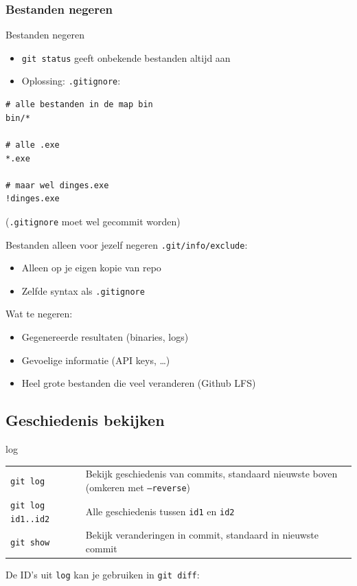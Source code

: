 \subsubsection{Bestanden negeren}
\begin{frame}[fragile]{Bestanden negeren}
	\begin{itemize}
		\item \texttt{git status} geeft onbekende bestanden altijd aan
		\item Oplossing: \texttt{.gitignore}:
	\end{itemize}
	\begin{verbatim}
# alle bestanden in de map bin
bin/*

# alle .exe
*.exe

# maar wel dinges.exe
!dinges.exe
	\end{verbatim}

	(\texttt{.gitignore} moet wel gecommit worden)
\end{frame}

\begin{frame}{Bestanden alleen voor jezelf negeren}
	\texttt{.git/info/exclude}:
	\begin{itemize}
		\item Alleen op je eigen kopie van repo
		\item Zelfde syntax als \texttt{.gitignore}
	\end{itemize}

	Wat te negeren:
	\begin{itemize}
		\item Gegenereerde resultaten (binaries, logs)
		\item Gevoelige informatie (API keys, \ldots)
		\item Heel grote bestanden die veel veranderen (Github LFS)
	\end{itemize}
\end{frame}

\subsection{Geschiedenis bekijken}
\begin{frame}{log}
	\begin{tabularx}{\linewidth}{lX}
		\texttt{git log}
			& Bekijk geschiedenis van commits, standaard nieuwste boven (omkeren met \texttt{--reverse})\\
		\texttt{git log id1..id2}
			& Alle geschiedenis tussen \texttt{id1} en \texttt{id2}\\
		\texttt{git show}
			& Bekijk veranderingen in commit, standaard in nieuwste commit
	\end{tabularx}

	\medskip
	De ID's uit \texttt{log} kan je gebruiken in \texttt{git diff}:
\end{frame}

